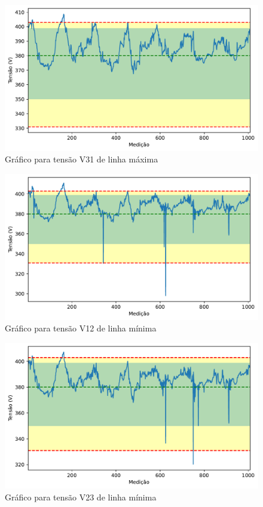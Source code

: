 \begin{figure}[H]
	\centering
	\caption{Gráfico para tensão V31 de linha máxima}
    \includegraphics[width=16cm]{illustrations/figures/a1_V31_Max.pdf}
\end{figure}

\begin{figure}[H]
	\centering
	\caption{Gráfico para tensão V12 de linha mínima}
    \includegraphics[width=16cm]{illustrations/figures/a1_V12_Min.pdf}
\end{figure}

\begin{figure}[H]
	\centering
	\caption{Gráfico para tensão V23 de linha mínima}
    \includegraphics[width=16cm]{illustrations/figures/a1_V23_Min.pdf}
\end{figure}

